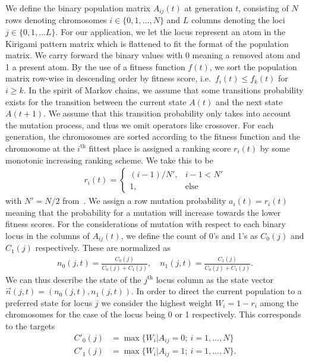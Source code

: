 We define the binary population matrix $A_{ij}(t)$ at generation $t$, consisting of
$N$ rows denoting chromosomes $i \in \{0, 1, \ldots, N\}$ and $L$ columns denoting the loci $j \in \{0, 1, \ldots L\}$. For our application, we let the locus represent an atom in the Kirigami pattern matrix which is flattened to fit the format of the population matrix. We carry forward the binary values with 0 meaning a removed atom and 1 a present atom. By the use of a fitness function $f(t)$, we sort the population matrix row-wise in descending order by fitness score, i.e.\ $f_i(t) \le f_k(t)$ for $i \ge k$. In the spirit of Markov chains, we assume that some transitions probability exists for the transition between the current state
$A(t)$ and the next state $A(t+1)$. We assume that this transition probability
only takes into account the mutation process, and thus we omit operators like
crossover. For each generation, the chromosomes are sorted according to the
fitness function and the chromosome at the $i^{\text{th}}$ fittest place is assigned a ranking score $r_i(t)$ by some monotonic increasing ranking scheme. We take this to be
\begin{align*}
  r_i(t) = 
  \begin{cases}
    (i-1)/N',& i-1 < N' \\
    1, &\text{else}
  \end{cases}
\end{align*}
with $N' = N/2$ from~\cite{Wang2010}. We assign a row mutation probability $a_i(t) = r_i(t)$ meaning that the probability for a mutation will increase towards the lower fitness scores. For the considerations of mutation with respect to each binary locus in the columns of $A_{ij}(t)$, we define the count of 0's and 1's as $C_0(j)$ and $C_1(j)$ respectively. These are normalized as
\begin{align*}
  n_0(j, t) = \frac{C_0(j)}{C_0(j) + C_1(j)}, \quad n_1(j, t) = \frac{C_1(j)}{C_0(j) + C_1(j)}.
\end{align*}
We can thus describe the state of the $j^{\text{th}}$ locus column as the state vector $\vec{n}(j,t)=(n_0(j, t), n_1(j, t))$. In order to direct the current population to a preferred state for locus $j$ we consider the highest weight $W_i = 1 - r_i$ among the chromosomes for the case of the locus being 0 or 1 respectively. This corresponds to the targets
\begin{align*}
  C'_0(j) &= \max\{W_i | A_{ij} = 0; \ i = 1, \ldots, N\} \\
  C'_1(j) &= \max\{W_i | A_{ij} = 1; \ i = 1, \ldots, N\}.
\end{align*}
